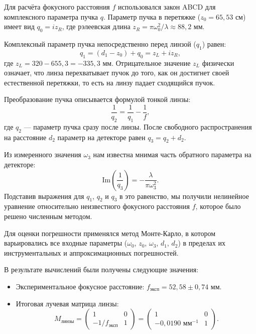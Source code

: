 \documentclass[12pt, a4paper]{article}
\begin{document}
Для расчёта фокусного расстояния $f$ использовался закон ABCD для комплексного параметра пучка $q$. Параметр пучка в перетяжке ($z_0 = 65,53$ см) имеет вид $q_0 = i z_R$, где рэлеевская длина $z_R = \pi \omega_0^2 / \lambda \approx 88,2$ мм.

Комплексный параметр пучка непосредственно перед линзой ($q_1$) равен:
\begin{equation}
    q_1 = (d_1 - z_0) + q_0 = z_L + i z_R,
\end{equation}
где $z_L = 320 - 655,3 = -335,3$ мм. Отрицательное значение $z_L$ физически означает, что линза перехватывает пучок до того, как он достигнет своей естественной перетяжки, то есть на линзу падает сходящийся пучок.

Преобразование пучка описывается формулой тонкой линзы:
\begin{equation}
    \frac{1}{q_2} = \frac{1}{q_1} - \frac{1}{f},
\end{equation}
где $q_2$ --- параметр пучка сразу после линзы. После свободного распространения на расстояние $d_2$ параметр на детекторе равен $q_3 = q_2 + d_2$.

Из измеренного значения $\omega_3$ нам известна мнимая часть обратного параметра на детекторе:
\begin{equation}
    \text{Im}\left(\frac{1}{q_3}\right) = -\frac{\lambda}{\pi \omega_3^2}.
\end{equation}
Подставив выражения для $q_1$, $q_2$ и $q_3$ в это равенство, мы получили нелинейное уравнение относительно неизвестного фокусного расстояния $f$, которое было решено численным методом.

Для оценки погрешности применялся метод Монте-Карло, в котором варьировались все входные параметры ($\omega_0$, $z_0$, $\omega_3$, $d_1$, $d_2$) в пределах их инструментальных и аппроксимационных погрешностей. 

В результате вычислений были получены следующие значения:
\begin{itemize}
    \item Экспериментальное фокусное расстояние: $f_{\text{эксп}} = 52,58 \pm 0,74$ мм.
    \item Итоговая лучевая матрица линзы:
    \begin{equation}
        M_{\text{линзы}} = \begin{pmatrix} 1 & 0 \\ -1/f_{\text{эксп}} & 1 \end{pmatrix} = \begin{pmatrix} 1 & 0 \\ -0,0190 \text{ мм}^{-1} & 1 \end{pmatrix}.
    \end{equation}
\end{itemize}
\end{document}
